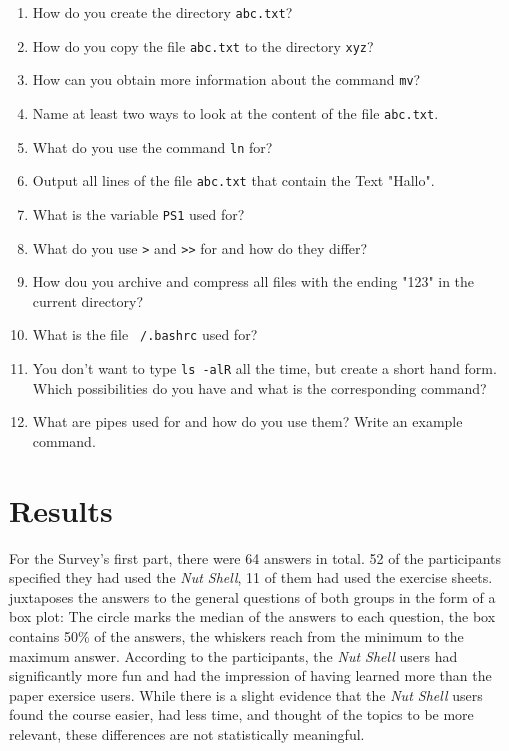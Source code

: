 \documentclass[paper=a4,twoside,abstract=on,cleardoublepage=empty,numbers=noenddot,toc=bib,12pt,appendixprefix=true]{scrreprt}
\begin{document}
\begin{enumerate}
    \item How do you create the directory \texttt{abc.txt}?
    \item How do you copy the file \texttt{abc.txt} to the directory \texttt{xyz}?
    \item How can you obtain more information about the command \texttt{mv}?
    \item Name at least two ways to look at the content of the file \texttt{abc.txt}.
    \item What do you use the command \texttt{ln} for?
    \item Output all lines of the file \texttt{abc.txt} that contain the Text "Hallo".
    \item What is the variable \texttt{PS1} used for?
    \item What do you use \texttt{>} and \texttt{>>} for and how do they differ?
    \item How dou you archive and compress all files with the ending "123" in the current directory?
    \item What is the file \texttt{~/.bashrc} used for?
    \item You don't want to type \texttt{ls -alR} all the time, but create a short hand form. Which possibilities do you have and what is the corresponding command?
    \item What are pipes used for and how do you use them? Write an example command.
\end{enumerate}

\section{Results}

For the Survey's first part, there were 64 answers in total. 52 of the participants specified they had used the \emph{Nut Shell}, 11 of them had used the exercise sheets.  juxtaposes the answers to the general questions of both groups in the form of a box plot: The circle marks the median of the answers to each question, the box contains 50\% of the answers, the whiskers reach from the minimum to the maximum answer. According to the participants, the \emph{Nut Shell} users had significantly more fun and had the impression of having learned more than the paper exersice users. While there is a slight evidence that the \emph{Nut Shell} users found the course easier, had less time, and thought of the topics to be more relevant, these differences are not statistically meaningful.
\end{document}
